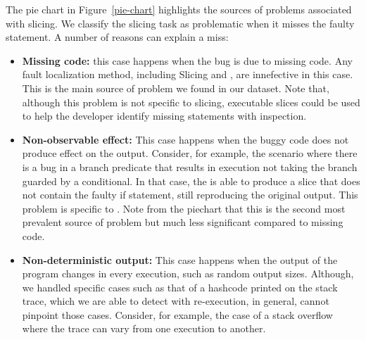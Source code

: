 \documentclass[sigplan,10pt,review,anonymous]{acmart}\settopmatter{printfolios=true,printccs=false,printacmref=false}
\begin{document}

The pie chart in Figure~\ref{pie-chart} highlights the sources of
problems associated with slicing.  We classify the slicing task as
problematic when it misses the faulty statement. A number of reasons
can explain a miss:

\begin{itemize}
\item \textbf{Missing code:} this case happens when the
bug is due to missing code. Any fault localization method, including
Slicing and \sfl{}, are innefective in this case. This is the main
source of problem we found in our dataset. Note that, although this
problem is not specific to slicing, executable slices could be used to
help the developer identify missing statements with
inspection.

\item \textbf{Non-observable effect:} This case happens when the
buggy code does not produce effect on the output. Consider, for
example, the scenario where there is a bug in a branch predicate that
results in execution not taking the branch guarded by a
conditional. In that case, the \CS{} is able to produce a slice that
does not contain the faulty if statement, still reproducing the
original output. This problem is specific to \CS{}. Note from the
piechart that this is the second most prevalent source of problem but
much less significant compared to missing
code.

\item \textbf{Non-deterministic output:} This case happens when the
  output of the program changes in every execution, such as random
  output sizes. Although, we handled specific cases such as that of a
  hashcode printed on the stack trace, which we are able to detect
  with re-execution, in general, \CS{} cannot pinpoint those cases.
  Consider, for example, the case of a stack overflow where the trace
  can vary from one execution to another.


\end{itemize}
\end{document}
